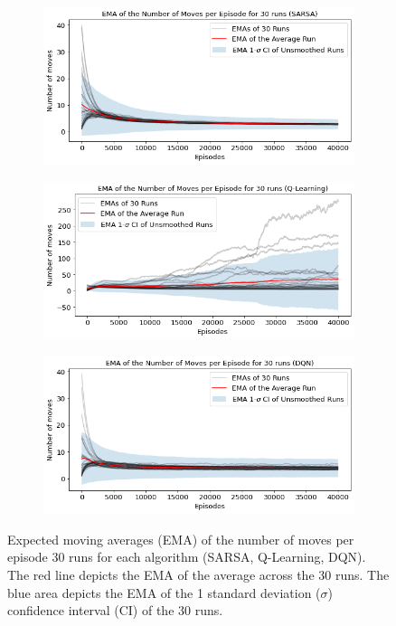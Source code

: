 \documentclass[conference]{IEEEtran}
\begin{document}
\begin{figure}[htbp!]
    \centering
    \begin{subfigure}[]{.45\textwidth}
        \includegraphics[width=\textwidth]{../figures/n_moves_30_runs_sarsa.png}
        \caption{}
    \end{subfigure}
    \begin{subfigure}[]{.45\textwidth}
        \includegraphics[width=\textwidth]{../figures/n_moves_30_runs_qlearning.png}
        \caption{}
    \end{subfigure}
    \begin{subfigure}[]{.45\textwidth}
        \includegraphics[width=\textwidth]{../figures/n_moves_30_runs_dqn.png}
        \caption{}
    \end{subfigure}
    \caption{Expected moving averages (EMA) of the number of moves per episode 30 runs for each algorithm (SARSA, Q-Learning, DQN). The red line depicts the EMA of the average across the 30 runs. The blue area depicts the EMA of the 1 standard deviation ($\sigma$) confidence interval (CI) of the 30 runs.}
    \label{fig:30runs_n_moves}
\end{figure}



\end{document}
